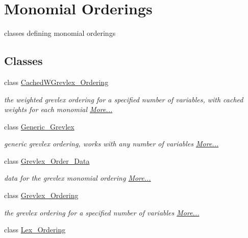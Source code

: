 \hypertarget{group__orderinggroup}{}\section{Monomial Orderings}
\label{group__orderinggroup}


classes defining monomial orderings  


\subsection*{Classes}
\begin{DoxyCompactItemize}
\item 
class \hyperlink{group__orderinggroup_class_cached_w_grevlex___ordering}{Cached\+W\+Grevlex\+\_\+\+Ordering}
\begin{DoxyCompactList}\small\item\em the weighted grevlex ordering for a specified number of variables, with cached weights for each monomial  \hyperlink{group__orderinggroup_class_cached_w_grevlex___ordering}{More...}\end{DoxyCompactList}\item 
class \hyperlink{group__orderinggroup_class_generic___grevlex}{Generic\+\_\+\+Grevlex}
\begin{DoxyCompactList}\small\item\em generic grevlex ordering, works with any number of variables  \hyperlink{group__orderinggroup_class_generic___grevlex}{More...}\end{DoxyCompactList}\item 
class \hyperlink{group__orderinggroup_class_grevlex___order___data}{Grevlex\+\_\+\+Order\+\_\+\+Data}
\begin{DoxyCompactList}\small\item\em data for the grevlex monomial ordering  \hyperlink{group__orderinggroup_class_grevlex___order___data}{More...}\end{DoxyCompactList}\item 
class \hyperlink{group__orderinggroup_class_grevlex___ordering}{Grevlex\+\_\+\+Ordering}
\begin{DoxyCompactList}\small\item\em the grevlex ordering for a specified number of variables  \hyperlink{group__orderinggroup_class_grevlex___ordering}{More...}\end{DoxyCompactList}\item 
class \hyperlink{group__orderinggroup_class_lex___ordering}{Lex\+\_\+\+Ordering}

\end{DoxyCompactItemize}
